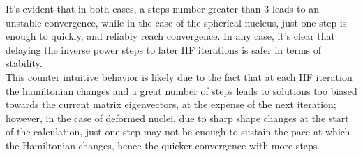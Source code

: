 It's evident that in both cases, a steps number greater than $3$ leads to an unstable convergence, while in the case of the spherical nucleus, just one step is enough to quickly, and reliably reach convergence. In any case, it's clear that delaying the inverse power steps to later HF iterations is safer in terms of stability.
\\This counter intuitive behavior is likely due to the fact that at each HF iteration the hamiltonian changes and a great number of steps leads to solutions too biased towards the current matrix eigenvectors, at the expense of the next iteration; however, in the case of deformed nuclei, due to sharp shape changes at the start of the calculation, just one step may not be enough to sustain the pace at which the Hamiltonian changes, hence the quicker convergence with more steps.



